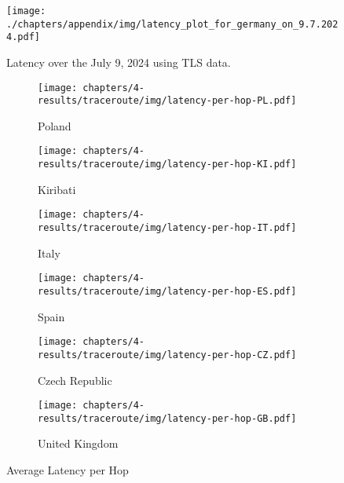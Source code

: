 \begin{figure}
	\texttt{[image: ./chapters/appendix/img/latency\_plot\_for\_germany\_on\_9.7.2024.pdf]}
	\caption{Latency over the July 9, 2024 using TLS data.}
	\label{fig:tls-analysis-individual-day}
\end{figure}

\begin{figure}
	\centering
	\begin{subfigure}[b]{0.48\linewidth}
		\texttt{[image: chapters/4-results/traceroute/img/latency-per-hop-PL.pdf]}
		\caption{Poland}
	\end{subfigure}
	\begin{subfigure}[b]{0.48\linewidth}
		\texttt{[image: chapters/4-results/traceroute/img/latency-per-hop-KI.pdf]}
		\caption{Kiribati}
	\end{subfigure}
	\begin{subfigure}[b]{0.48\linewidth}
		\texttt{[image: chapters/4-results/traceroute/img/latency-per-hop-IT.pdf]}
		\caption{Italy}
	\end{subfigure}
	\begin{subfigure}[b]{0.48\linewidth}
		\texttt{[image: chapters/4-results/traceroute/img/latency-per-hop-ES.pdf]}
		\caption{Spain}
	\end{subfigure}
	\begin{subfigure}[b]{0.48\linewidth}
		\texttt{[image: chapters/4-results/traceroute/img/latency-per-hop-CZ.pdf]}
		\caption{Czech Republic}
	\end{subfigure}
	\begin{subfigure}[b]{0.48\linewidth}
		\texttt{[image: chapters/4-results/traceroute/img/latency-per-hop-GB.pdf]}
		\caption{United Kingdom}
	\end{subfigure}
	\caption{Average Latency per Hop}
	\label{fig:latency-change-per-hop-appendix}
\end{figure}


